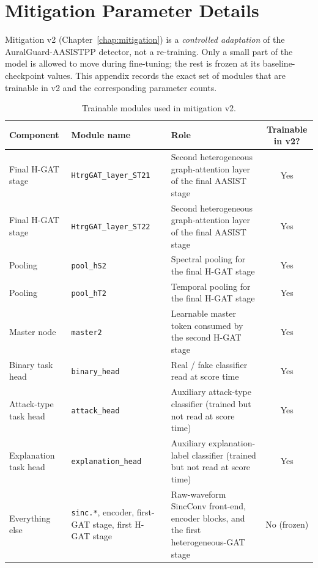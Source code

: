 \cleardoubleoddpage
\chapter{Mitigation Parameter Details}
\label{app:mitigation-parameters}

Mitigation v2 (Chapter~\ref{chap:mitigation}) is a \emph{controlled adaptation}
of the AuralGuard-AASISTPP detector, not a re-training. Only a small
part of the model is allowed to move during fine-tuning; the rest is
frozen at its baseline-checkpoint values. This appendix records the
exact set of modules that are trainable in v2 and the corresponding
parameter counts.

\begin{table}[t]
\centering
\caption{Trainable modules used in mitigation v2.}
\label{tab:appendix-mitigation-trainable-modules}
\scriptsize
\setlength{\tabcolsep}{4pt}
\begin{tabularx}{\linewidth}{@{}l l >{\raggedright\arraybackslash}X c@{}}
\toprule
\textbf{Component} & \textbf{Module name} & \textbf{Role} & \textbf{Trainable in v2?} \\
\midrule
Final H-GAT stage       & \texttt{HtrgGAT\_layer\_ST21} & Second heterogeneous graph-attention layer of the final AASIST stage & Yes \\
Final H-GAT stage       & \texttt{HtrgGAT\_layer\_ST22} & Second heterogeneous graph-attention layer of the final AASIST stage & Yes \\
Pooling                 & \texttt{pool\_hS2}            & Spectral pooling for the final H-GAT stage                          & Yes \\
Pooling                 & \texttt{pool\_hT2}            & Temporal pooling for the final H-GAT stage                          & Yes \\
Master node             & \texttt{master2}              & Learnable master token consumed by the second H-GAT stage           & Yes \\
Binary task head        & \texttt{binary\_head}         & Real / fake classifier read at score time                           & Yes \\
Attack-type task head   & \texttt{attack\_head}         & Auxiliary attack-type classifier (trained but not read at score time) & Yes \\
Explanation task head   & \texttt{explanation\_head}    & Auxiliary explanation-label classifier (trained but not read at score time) & Yes \\
\midrule
Everything else         & \texttt{sinc.*}, encoder, first-GAT stage, first H-GAT stage & Raw-waveform SincConv front-end, encoder blocks, and the first heterogeneous-GAT stage & No (frozen) \\
\bottomrule
\end{tabularx}
\end{table}

